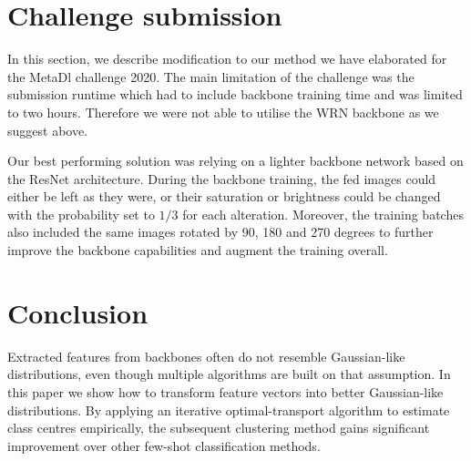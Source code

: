 \documentclass[letterpaper]{article} \usepackage{aaai20}  \usepackage{times}  \usepackage{helvet} \usepackage{courier}  \usepackage[hyphens]{url}  \usepackage{graphicx} \urlstyle{rm} \def\UrlFont{\rm}  \usepackage{graphicx}  \frenchspacing  \setlength{\pdfpagewidth}{8.5in}  \setlength{\pdfpageheight}{11in}  \usepackage[ruled,vlined]{algorithm2e}
\begin{document}
\begin{table}[]
\caption{$p$-values of the paired t-test with the null hypothesis that the accuracy of the PT+MAP model is greater or equal than the accuracy of the LST+MAP model against the alternative that the accuracy of the PT+MAP model is smaller than the accuracy of the LST+MAP model.}
\vspace{5mm}
\label{tab:ttest}
\centering
{}
\end{table}

\section{Challenge submission}
In this section, we describe modification to our method we have elaborated for the MetaDl challenge 2020. The main limitation of the challenge was the submission runtime which had to include backbone training time and was limited to two hours. Therefore we were not able to utilise the WRN backbone as we suggest above.

Our best performing solution was relying on a lighter backbone network based on the ResNet architecture. During the backbone training, the fed images could either be left as they were, or their saturation or brightness could be changed with the probability set to $1/3$ for each alteration. Moreover, the training batches also included the same images rotated by 90, 180 and 270 degrees to further improve the backbone capabilities and augment the training overall. 

\section{Conclusion}
Extracted features from backbones often do not resemble Gaussian-like distributions, even though multiple algorithms are built on that assumption. In this paper we show how to transform feature vectors into better Gaussian-like distributions. By applying an iterative optimal-transport algorithm to estimate class centres empirically, the subsequent clustering method gains significant improvement over other few-shot classification methods. 
\end{document}
